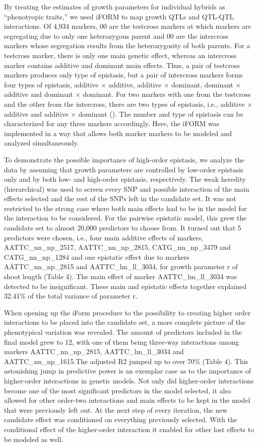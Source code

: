 \documentclass[11pt,]{book}
\theoremstyle{definition}
\theoremstyle{definition}
\theoremstyle{remark}
\begin{document}
By treating the estimates of growth parameters for individual hybrids as
``phenotyopic traits,'' we used iFORM to map growth QTLs and QTL-QTL
interactions. Of 4,934 markers, 00 are the testcross markers at which
markers are segregating due to only one heterozygous parent and 00 are
the intercross markers whose segregation results from the heterozygosity
of both parents. For a testcross marker, there is only one main genetic
effect, whereas an intercross marker contains additive and dominant main
effects. Thus, a pair of testcross markers produces only type of
epistasis, but a pair of intercross markers forms four types of
epistasis, additive × additive, additive × dominant, dominant × additive
and dominant × dominant. For two markers with one from the testcross and
the other from the intercross, there are two types of epistasis, i.e.,
additive × additive and additive × dominant (\cite{tong20113funmap}).
The number and type of epistasis can be characterized for any three
markers accordingly. Here, the iFORM was implemented in a way that
allows both marker markers to be modeled and analyzed simultaneously.

To demonstrate the possible importance of high-order epistasis, we
analyze the data by assuming that growth parameters are controlled by
low-order epistasis only and by both low- and high-order epistasis,
respectively. The weak heredity (hierarchical) was used to screen every
SNP and possible interaction of the main effects selected and the rest
of the SNPs left in the candidate set. It was not restricted to the
strong case where both main effects had to be in the model for the
interaction to be considered. For the pairwise epistatic model, this
grew the candidate set to almost 20,000 predictors to choose from. It
turned out that 5 predictors were chosen, i.e., four main additive
effects of markers, AATTC\_nn\_np\_2517, AATTC\_nn\_np\_2815,
CATG\_nn\_np\_3479 and CATG\_nn\_np\_1284 and one epistatic effect due
to markers AATTC\_nn\_np\_2815 and AATTC\_lm\_ll\_3034, for growth
parameter r of shoot length (Table 4). The main effect of marker
AATTC\_lm\_ll\_3034 was detected to be insignificant. These main and
epistatic effects together explained 32.41\% of the total variance of
parameter r.

When opening up the iForm procedure to the possibility to creating
higher order interactions to be placed into the candidate set, a more
complete picture of the phenotypical variation was revealed. The amount
of predictors included in the final model grew to 12, with one of them
being three-way interactions among markers AATTC\_nn\_np\_2815,
AATTC\_lm\_ll\_3034 and AATTC\_nn\_np\_1615.The adjusted R2 jumped up to
over 70\% (Table 4). This astonishing jump in predictive power is an
exemplar case as to the importance of higher-order interactions in
genetic models. Not only did higher-order interactions become one of the
most significant predictors in the model selected, it also allowed for
other order-two interactions and main effects to be kept in the model
that were previously left out. At the next step of every iteration, the
new candidate effect was conditioned on everything previously selected.
With the conditional effect of the higher-order interaction it enabled
for other lost effects to be modeled as well.
\end{document}
